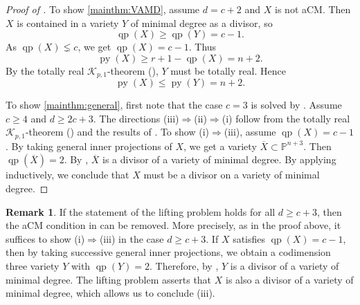 \documentclass[11pt,letterpaper,reqno]{amsart}
\theoremstyle{plain}
\theoremstyle{definition}
\newtheorem{remark}[theorem]{Remark}
\newtheorem{open problem}[theorem]{Open Problem}
\newtheorem{remark and notation}[theorem]{Remark and Notation}
\newtheorem{remark and definition}[theorem]{Remark and Definition}
\newtheorem{definition and notation}[theorem]{Definition and Notation}
\newtheorem{notation and convention}[theorem]{Notation and Convention}
\newtheorem{notation and remark}[theorem]{Notation and Remark}
\newtheorem{convention and notation}[theorem]{Convention and Notation}
\def \p {\mathbb{P}}
\def \py {\operatorname{py}}
\def \qp {\operatorname{qp}}
\begin{document}
\begin{proof}[Proof of ]
    To show \eqref{mainthm:VAMD}, assume $d=c+2$ and $X$ is not aCM. Then $X$ is contained in a variety $Y$ of minimal degree as a divisor, so $$\qp(X)\geq \qp(Y)=c-1.$$ 
    As $\qp(X)\lneq c$, we get $\qp(X)=c-1$.
    Thus $$\py(X)\geq r+1-\qp(X)=n+2.$$
    By the totally real $\mathcal{K}_{p,1}$-theorem (), $Y$ must be totally real.
    Hence $$\py(X)\leq \py(Y)=n+2.$$

    To show \eqref{mainthm:general}, first note that the case $c=3$ is solved by .
    Assume $c\geq 4$ and $d\geq 2c+3$.
    The directions (iii)$\Rightarrow$(ii)$\Rightarrow$(i) follow from the totally real $\mathcal{K}_{p,1}$-theorem () and the results of \cite{MR4397034}.
    To show (i)$\Rightarrow$(iii), assume $\qp(X)=c-1$. By taking general inner projections of $X$, we get a variety $\overline{X}\subset \p^{n+3}$.
    Then $\qp(\overline{X})=2$.
    By , $\overline{X}$ is a divisor of a variety of minimal degree.
    By applying  inductively, we conclude that $X$ must be a divisor on a variety of minimal degree.
\end{proof}

\begin{remark}\label{transform_to_lp}
	If the statement of the lifting problem holds for all $d\geq c+3$, then the aCM condition in  can be removed. More precisely, as in the proof above, it suffices to show (i)$\Rightarrow$(iii) in the case $d\geq c+3$. If $X$ satisfies $\qp(X)=c-1$, then by taking successive general inner projections, we obtain a codimension three variety $Y$ with $\qp(Y)=2$. Therefore, by , $Y$ is a divisor of a variety of minimal degree. The lifting problem asserts that $X$ is also a divisor of a variety of minimal degree, which allows us to conclude (iii).
\end{remark}


\bigskip
\end{document}
